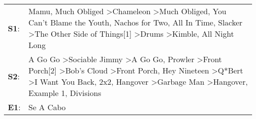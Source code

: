 \begin{supertabular}{p{0.03\textwidth}p{0.92\textwidth}}
 \textbf{S1}:  &                                                                                                                                                                            Mamu\textsuperscript{}, \enspace Much Obliged\textsuperscript{} \textgreater \enspace Chameleon\textsuperscript{} \textgreater \enspace Much Obliged\textsuperscript{}, \enspace You Can't Blame the Youth\textsuperscript{}, \enspace Nachos for Two\textsuperscript{}, \enspace All In Time\textsuperscript{}, \enspace Slacker\textsuperscript{} \textgreater \enspace The Other Side of Things[1]\textsuperscript{} \textgreater \enspace Drums\textsuperscript{} \textgreater \enspace Kimble\textsuperscript{}, \enspace All Night Long\textsuperscript{}  \enspace  \\
 \textbf{S2}:  &  A Go Go\textsuperscript{} \textgreater \enspace Sociable Jimmy\textsuperscript{} \textgreater \enspace A Go Go\textsuperscript{}, \enspace Prowler\textsuperscript{} \textgreater \enspace Front Porch[2]\textsuperscript{} \textgreater \enspace Bob's Cloud\textsuperscript{} \textgreater \enspace Front Porch\textsuperscript{}, \enspace Hey Nineteen\textsuperscript{} \textgreater \enspace Q*Bert\textsuperscript{} \textgreater \enspace I Want You Back\textsuperscript{}, \enspace 2x2\textsuperscript{}, \enspace Hangover\textsuperscript{} \textgreater \enspace Garbage Man\textsuperscript{} \textgreater \enspace Hangover\textsuperscript{}, \enspace Example 1\textsuperscript{}, \enspace Divisions\textsuperscript{}  \enspace  \\
 \textbf{E1}:  &                                                                                                                                                                                                                                                                                                                                                                                                                                                                                                                                                                                                                                                                                                                Se A Cabo\textsuperscript{}  \enspace  \\
\end{supertabular}
